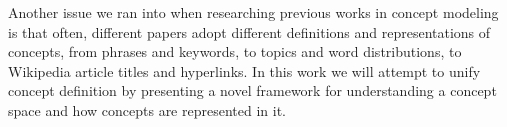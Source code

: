 Another issue we ran into when researching previous works in concept modeling is that often, different papers adopt different definitions and representations of concepts, from phrases and keywords, to topics and word distributions, to Wikipedia article titles and hyperlinks. %
In this work we will attempt to unify concept definition by presenting a novel framework for understanding a concept space and how concepts are represented in it.